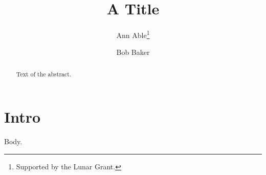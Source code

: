 \documentclass{article}
\begin{document}
\title{A Title}
\author{Ann Able\thanks{Supported by the Lunar Grant.}}
\author{Bob Baker}
\maketitle
\begin{abstract}
Text of the abstract.
\end{abstract}
\section{Intro}
Body.
\end{document}
